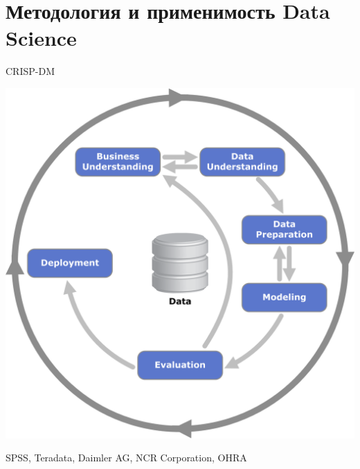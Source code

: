 \documentclass[10pt,a4paper]{beamer}
\begin{document}

\section{Методология и применимость Data Science}

\begin{frame}{CRISP-DM}

\begin{center}
\includegraphics[scale=0.4]{images/crisp.png}

SPSS, Teradata, Daimler AG, NCR Corporation, OHRA
\end{center}

\end{frame}

\end{document}

